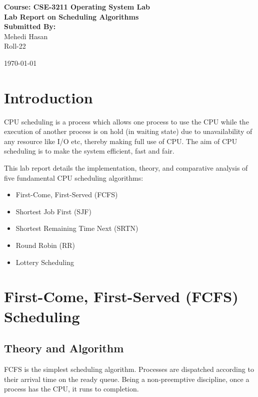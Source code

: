 \documentclass[12pt,a4paper]{article}
\begin{document}
\begin{titlepage}
    \centering
    \vspace*{4cm}
    
    {\Large \textbf{Course: CSE-3211 Operating System Lab}}\\[1.5cm]
    
    {\Huge \textbf{Lab Report on Scheduling Algorithms}}\\[2cm]
    
    \textbf{\Large Submitted By:}\\[0.5cm]
    {\large Mehedi Hasan}\\
    {\large Roll-22}\\[2cm]
    
    \vfill
    
    {\large \today}
\end{titlepage}

\tableofcontents
\newpage

\section{Introduction}
CPU scheduling is a process which allows one process to use the CPU while the execution of another process is on hold (in waiting state) due to unavailability of any resource like I/O etc, thereby making full use of CPU. The aim of CPU scheduling is to make the system efficient, fast and fair.

This lab report details the implementation, theory, and comparative analysis of five fundamental CPU scheduling algorithms:
\begin{itemize}
    \item First-Come, First-Served (FCFS)
    \item Shortest Job First (SJF)
    \item Shortest Remaining Time Next (SRTN)
    \item Round Robin (RR)
    \item Lottery Scheduling
\end{itemize}

\newpage
\section{First-Come, First-Served (FCFS) Scheduling}

\subsection{Theory and Algorithm}
FCFS is the simplest scheduling algorithm. Processes are dispatched according to their arrival time on the ready queue. Being a non-preemptive discipline, once a process has the CPU, it runs to completion.
\end{document}
